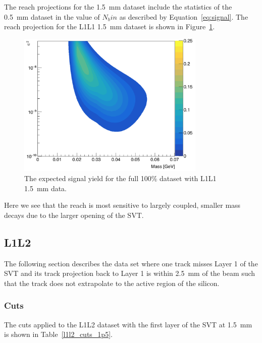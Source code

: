 \documentclass[twoside]{article}
\begin{document}
The reach projections for the 1.5~mm dataset include the statistics of the 0.5~mm dataset in the value of $N_bin$ as described by Equation~\ref{eq:signal}. The reach projection for the L1L1 1.5~mm dataset is shown in Figure~\ref{fig:reach1p5}.

\begin{figure}[H]
  \centering
     \includegraphics[width=0.8\textwidth]{plots/reachL1L1_1p5.png}
  \caption{The expected signal yield for the full 100$\%$ dataset with L1L1 1.5~mm data.}
  \label{fig:reach1p5}
\end{figure} 

Here we see that the reach is most sensitive to largely coupled, smaller mass decays due to the larger opening of the SVT. 

\subsection{L1L2}

The following section describes the data set where one track misses Layer 1 of the SVT and its track projection back to Layer 1 is within 2.5~mm of the beam such that the track does not extrapolate to the active region of the silicon.

\subsubsection{Cuts}

The cuts applied to the L1L2 dataset with the first layer of the SVT at 1.5~mm is shown in Table~\ref{l1l2_cuts_1p5}.
\end{document}
